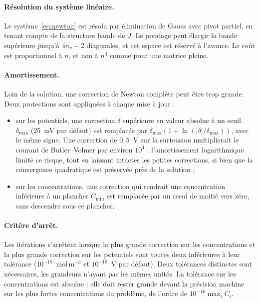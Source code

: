 \paragraph{Résolution du système linéaire.} Le système~\eqref{eq:newton} est
résolu par élimination de Gauss avec pivot partiel, en tenant compte de la
structure bande de $J$. Le pivotage peut élargir la bande supérieure jusqu'à
$4n_v - 2$ diagonales, et cet espace est réservé à l'avance. Le coût est
proportionnel à $n$, et non à $n^3$ comme pour une matrice pleine.

\paragraph{Amortissement.} Loin de la solution, une correction de Newton
complète peut être trop grande. Deux protections sont appliquées à chaque
mise à jour :
\begin{itemize}
    \item sur les potentiels, une correction $\delta$ supérieure en valeur
    absolue à un seuil $\delta_{\max}$ (25~mV par défaut) est remplacée par
    $\delta_{\max}\left(1 + \ln(|\delta|/\delta_{\max})\right)$, avec le même
    signe. Une correction de $0{,}5$~V sur la surtension multiplierait
    le courant de Butler--Volmer par environ $10^4$ : l'amortissement
    logarithmique limite ce risque, tout en laissant intactes les petites
    corrections, si bien que la convergence quadratique est préservée près de
    la solution ;
    \item sur les concentrations, une correction qui rendrait une
    concentration inférieure à un plancher $C_{\min}$ est remplacée par un
    recul de moitié vers zéro, sans descendre sous ce plancher.
\end{itemize}

\paragraph{Critère d'arrêt.} Les itérations s'arrêtent lorsque la plus
grande correction sur les concentrations et la plus grande correction sur
les potentiels sont toutes deux inférieures à leur tolérance
($10^{-10}$~mol\,m$^{-3}$ et $10^{-10}$~V par défaut). Deux tolérances
distinctes sont nécessaires, les grandeurs n'ayant pas les mêmes unités.
La tolérance sur les concentrations est absolue : elle doit rester grande
devant la précision machine sur les plus fortes concentrations du problème,
de l'ordre de $10^{-16}\max_i C_i$.

